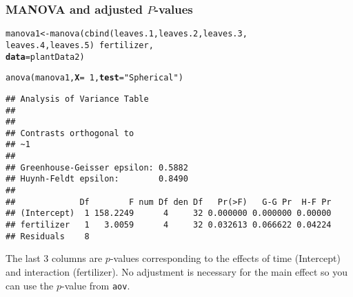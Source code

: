 \documentclass[color=usenames,dvipsnames]{beamer}\usepackage[]{graphicx}\usepackage[]{color}
\makeatletter
\newcommand{\hlnum}[1]{\textcolor[rgb]{0.69,0.494,0}{#1}}%
\newcommand{\hlstr}[1]{\textcolor[rgb]{0.749,0.012,0.012}{#1}}%
\newcommand{\hlopt}[1]{\textcolor[rgb]{0,0,0}{#1}}%
\newcommand{\hlstd}[1]{\textcolor[rgb]{0,0,0}{#1}}%
\newcommand{\hlkwb}[1]{\textcolor[rgb]{0,0.341,0.682}{#1}}%
\newcommand{\hlkwc}[1]{\textcolor[rgb]{0,0,0}{\textbf{#1}}}%
\newcommand{\hlkwd}[1]{\textcolor[rgb]{0.004,0.004,0.506}{#1}}%
\newenvironment{kframe}{%
 \def\at@end@of@kframe{}%
 \ifinner\ifhmode%
  \def\at@end@of@kframe{\end{minipage}}%
  \begin{minipage}{\columnwidth}%
 \fi\fi%
 \def\FrameCommand##1{\hskip\@totalleftmargin \hskip-\fboxsep
 \colorbox{shadecolor}{##1}\hskip-\fboxsep
     \hskip-\linewidth \hskip-\@totalleftmargin \hskip\columnwidth}%
 \MakeFramed {\advance\hsize-\width
   \@totalleftmargin\z@ \linewidth\hsize
   \@setminipage}}%
 {\par\unskip\endMakeFramed%
 \at@end@of@kframe}
\newenvironment{knitrout}{}{} %
\newcommand{\inr}[1]{\colorbox{inlinecolor}{\texttt{#1}}}
\makeatother
\begin{document}
\begin{frame}[fragile]
  \frametitle{MANOVA and adjusted $P$-values}
  \scriptsize %
\begin{knitrout}\scriptsize
{}\color{fgcolor}\begin{kframe}
\begin{alltt}
\hlstd{manova1} \hlkwb{<-} \hlkwd{manova}\hlstd{(}\hlkwd{cbind}\hlstd{(leaves.1, leaves.2, leaves.3,}
                        \hlstd{leaves.4, leaves.5)} \hlopt{~} \hlstd{fertilizer,}
                  \hlkwc{data}\hlstd{=plantData2)}
\end{alltt}
\end{kframe}
\end{knitrout}
\pause
\begin{knitrout}\scriptsize
{}\color{fgcolor}\begin{kframe}
\begin{alltt}
\hlkwd{anova}\hlstd{(manova1,} \hlkwc{X}\hlstd{=}\hlopt{~}\hlnum{1}\hlstd{,} \hlkwc{test}\hlstd{=}\hlstr{"Spherical"}\hlstd{)}
\end{alltt}
\begin{verbatim}
## Analysis of Variance Table
## 
## 
## Contrasts orthogonal to
## ~1
## 
## Greenhouse-Geisser epsilon: 0.5882
## Huynh-Feldt epsilon:        0.8490
## 
##             Df        F num Df den Df   Pr(>F)   G-G Pr  H-F Pr
## (Intercept)  1 158.2249      4     32 0.000000 0.000000 0.00000
## fertilizer   1   3.0059      4     32 0.032613 0.066622 0.04224
## Residuals    8
\end{verbatim}
\end{kframe}
\end{knitrout}
\pause
\footnotesize
{%
  The last 3 columns are $p$-values corresponding to the effects of time
  (Intercept) and interaction (fertilizer).
  No adjustment is necessary
  for the main effect so you can use the $p$-value from \inr{aov}.
  \par}
\end{frame}
\end{document}
